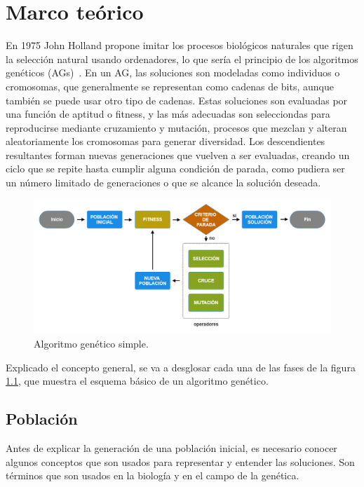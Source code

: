 \chapter{Marco teórico}
\label{ch:marco-teorico}

En 1975 John Holland propone imitar los procesos biológicos naturales que rigen la selección natural usando ordenadores, lo que sería el principio de los algoritmos genéticos (AGs)~\cite{holland1975}. En un AG, las soluciones son modeladas como individuos o cromosomas, que generalmente se representan como cadenas de bits, aunque también se puede usar otro tipo de cadenas. Estas soluciones son evaluadas por una función de aptitud o fitness, y las más adecuadas son selecciondas para reproducirse mediante cruzamiento y mutación, procesos que mezclan y alteran aleatoriamente los cromosomas para generar diversidad. Los descendientes resultantes forman nuevas generaciones que vuelven a ser evaluadas, creando un ciclo que se repite hasta cumplir alguna condición de parada, como pudiera ser un número limitado de generaciones o que se alcance la solución deseada.

\begin{figure}[H]
    \centering
    \includegraphics[width=1\textwidth]{figures/algoritmo-genetico.png}
    \caption{Algoritmo genético simple.}
    \label{fig:algoritmo-genetico}
  \end{figure}

Explicado el concepto general, se va a desglosar cada una de las fases de la figura \ref{fig:algoritmo-genetico}, que muestra el esquema básico de un algoritmo genético.

\section{Población}

Antes de explicar la generación de una población inicial, es necesario conocer algunos conceptos que son usados para representar y entender las soluciones. Son términos que son usados en la biología y en el campo de la genética. 

